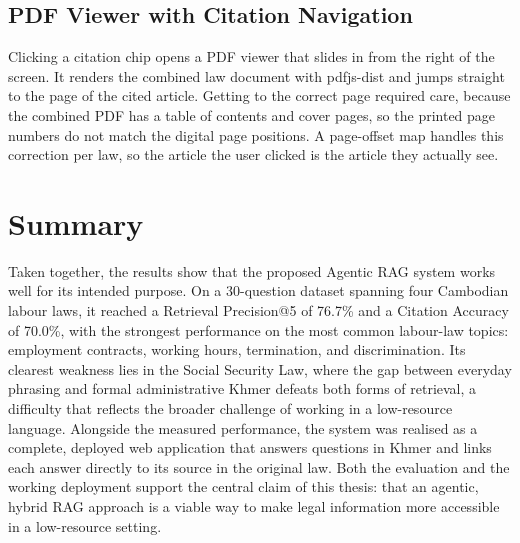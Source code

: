 \subsection{PDF Viewer with Citation Navigation}

\hs Clicking a citation chip opens a PDF viewer that slides in from the right of the
screen. It renders the combined law document with pdfjs-dist and jumps straight to the
page of the cited article. Getting to the correct page required care, because the combined
PDF has a table of contents and cover pages, so the printed page numbers do not match the
digital page positions. A page-offset map handles this correction per law, so the article
the user clicked is the article they actually see.


\section{Summary}

\hs Taken together, the results show that the proposed Agentic RAG system works well for
its intended purpose. On a 30-question dataset spanning four Cambodian labour laws, it
reached a Retrieval Precision@5 of 76.7\% and a Citation Accuracy of 70.0\%, with the
strongest performance on the most common labour-law topics: employment contracts, working
hours, termination, and discrimination. Its clearest weakness lies in the Social Security
Law, where the gap between everyday phrasing and formal administrative Khmer defeats both
forms of retrieval, a difficulty that reflects the broader challenge of working in a
low-resource language. Alongside the measured performance, the system was realised as a
complete, deployed web application that answers questions in Khmer and links each answer
directly to its source in the original law. Both the evaluation and the working
deployment support the central claim of this thesis: that an agentic, hybrid RAG approach
is a viable way to make legal information more accessible in a low-resource setting.
